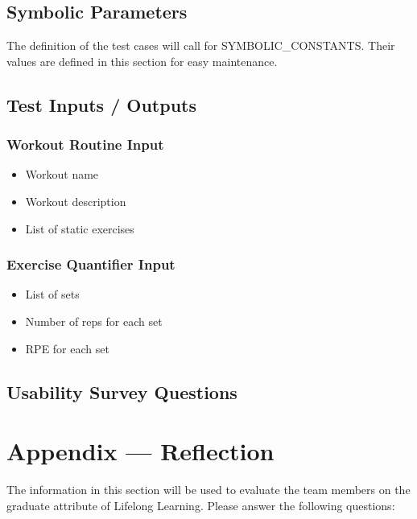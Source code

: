\documentclass[12pt, titlepage]{article}
\begin{document}
	\subsection{Symbolic Parameters}
	
	The definition of the test cases will call for SYMBOLIC\_CONSTANTS.
	Their values are defined in this section for easy maintenance.
	
	\subsection{Test Inputs / Outputs}
	\subsubsection{Workout Routine Input\label{WR-1-input}}
	\begin{itemize}
		\item Workout name
		\item Workout description
		\item List of static exercises
	\end{itemize}

	\subsubsection{Exercise Quantifier Input\label{QT-1-input}}
	\begin{itemize}
		\item List of sets
		\item Number of reps for each set
		\item RPE for each set
	\end{itemize}

	\subsection{Usability Survey Questions}
	
	\newpage{}
	\section*{Appendix --- Reflection}
	
	The information in this section will be used to evaluate the team members on the
	graduate attribute of Lifelong Learning.  Please answer the following questions:
	
\end{document}
